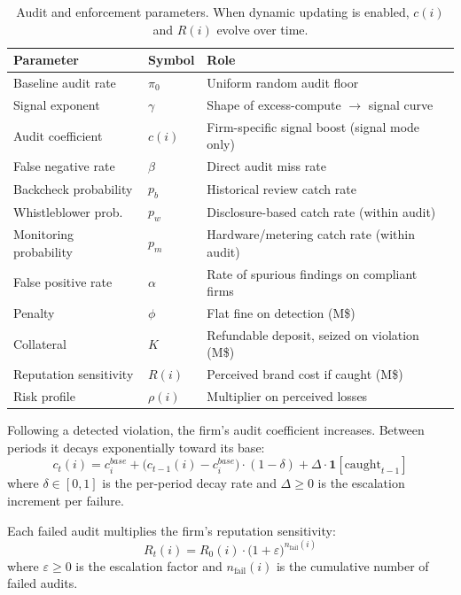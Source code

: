 \begin{table}[h!]
\centering
\begin{tabular}{@{}lll@{}}
\toprule
Parameter & Symbol & Role \\
\midrule
Baseline audit rate    & $\pi_0$    & Uniform random audit floor \\
Signal exponent        & $\gamma$   & Shape of excess-compute $\to$ signal curve \\
Audit coefficient      & $c(i)$     & Firm-specific signal boost (signal mode only) \\
False negative rate    & $\beta$    & Direct audit miss rate \\
Backcheck probability  & $p_b$      & Historical review catch rate \\
Whistleblower prob.    & $p_w$      & Disclosure-based catch rate (within audit) \\
Monitoring probability & $p_m$      & Hardware/metering catch rate (within audit) \\
False positive rate    & $\alpha$   & Rate of spurious findings on compliant firms \\
Penalty                & $\phi$     & Flat fine on detection (M\$) \\
Collateral             & $K$        & Refundable deposit, seized on violation (M\$) \\
Reputation sensitivity & $R(i)$     & Perceived brand cost if caught (M\$) \\
Risk profile           & $\rho(i)$  & Multiplier on perceived losses \\
\bottomrule
\end{tabular}
\caption{Audit and enforcement parameters. When dynamic updating is enabled, $c(i)$ and $R(i)$ evolve over time.}
\end{table}

Following a detected violation, the firm's audit coefficient increases. Between periods it decays exponentially toward its base:
\begin{equation}
    c_t(i) = c_i^{base} + \big(c_{t-1}(i) - c_i^{base}\big)\cdot(1 - \delta) + \Delta \cdot \mathbf{1}[\text{caught}_{t-1}]
\end{equation}
where $\delta \in [0,1]$ is the per-period decay rate and $\Delta \geq 0$ is the escalation increment per failure.

Each failed audit multiplies the firm's reputation sensitivity:
\begin{equation}
    R_t(i) = R_0(i)\cdot\big(1 + \varepsilon\big)^{n_{\text{fail}}(i)}
\end{equation}
where $\varepsilon \geq 0$ is the escalation factor and $n_{\text{fail}}(i)$ is the cumulative number of failed audits.

